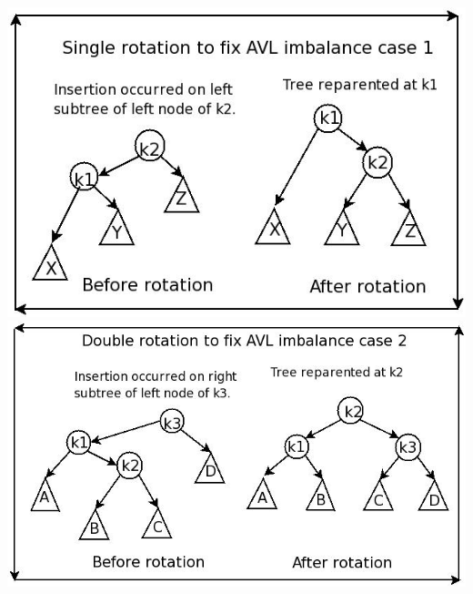 \documentclass[a4paper]{book}
\begin{document}
\begin{center}
\includegraphics[scale=0.6]{Figures/singlerot.jpg}
\includegraphics[scale=0.55]{Figures/doublerot.jpg}
\end{center}
\end{document}
